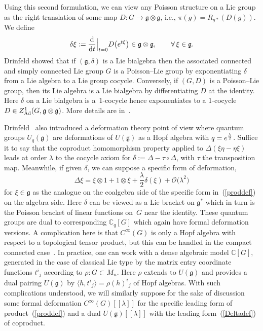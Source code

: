 \documentclass[pdftex]{sigma}
\numberwithin{equation}{section}
\newcommand{\C}{{\mathbb{C}}}
\newcommand{\<}{{\langle}}
\renewcommand{\>}{{\rangle}}
\newcommand{\tens}{\otimes}
\newcommand{\extd}{{\rm d}}
\newcommand{\cg}{{\mathfrak{g}}}
\begin{document}
Using this second formulation, we can view any Poisson structure on a Lie group as the right translation of some map $D\colon G\to\mathfrak{g}\tens\mathfrak{g}$, i.e., $\pi(g)=R_{g*}(D(g))$. We define
\begin{equation*}%
\delta\xi:= {\extd\over\extd t}\Big|_{t=0} D\big(e^{t\xi}\big)\in \cg\tens\cg,\qquad\forall\, \xi\in\mathfrak{g}.\end{equation*}
Drinfeld showed that if $(\cg,\delta)$ is a Lie bialgebra then the associated connected and simply connected Lie group $G$ is a Poisson--Lie group by exponentiating $\delta$ from a Lie algebra to a Lie group cocycle. Conversely, if $(G,D)$ is a Poisson--Lie group, then its Lie algebra is a Lie bialgebra by differentiating $D$ at the identity. Here $\delta$ on a Lie bialgebra is a~$1$-cocycle hence exponentiates to a 1-cocycle $D\in Z^1_{{\rm Ad}}(G,\mathfrak{g}\tens\mathfrak{g})$. More details are in~\cite{Ma:book}.

Drinfeld~\cite{Drinfeld} also introduced a deformation theory point of view where quantum groups $U_q(\cg)$ are deformations of $U(\cg)$ as a Hopf algebra with $q=e^{\lambda\over 2}$. Suffice it to say that the coproduct homomorphism property applied to $\Delta(\xi\eta-\eta\xi)$ leads at order $\lambda$ to the cocycle axiom for $\delta:=\Delta-\tau\circ\Delta$, with $\tau$ the transposition map. Meanwhile, if given $\delta$, we can suppose a specific form of deformation,
\begin{equation}\label{Deltadef} \Delta \xi=\xi\tens 1+ 1\tens\xi+\frac{\lambda}{2}\delta(\xi) + \mathcal{O}\big(\lambda^2\big)\end{equation}
for $\xi\in\cg$ as the analogue on the coalgebra side of the specific form in~(\ref{proddef}) on the algebra side. Here $\delta$ can be viewed as a Lie bracket on $\cg^*$ which in turn is the Poisson bracket of linear functions on~$G$ near the identity. These quantum groups are dual to corresponding $\C_q[G]$ which again have formal deformation versions. A complication here is that $C^\infty(G)$ is only a Hopf algebra with respect to a topological tensor product, but this can be handled in the compact connected case~\cite{Bon}. In practice, one can work with a dense algebraic model $\C[G]$, generated in the case of classical Lie type by the matrix entry coordinate functions $t^i{}_j$ according to $\rho\colon G\subset M_n$. Here $\rho$ extends to $U(\cg)$ and provides a dual pairing $U(\cg)$ by $\<h,t^i{}_j\>=\rho(h)^i{}_j$ of Hopf algebras. With such complications understood, we will similarly suppose for the sake of discussion some formal deformation $C^\infty(G)[[\lambda]]$ for the specific leading form of product~(\ref{proddef}) and a dual $U(\cg)[[\lambda]]$ with the leading form~(\ref{Deltadef}) of coproduct.
\end{document}
